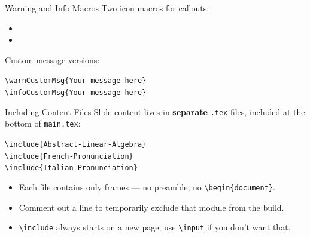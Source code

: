 \blueheader
\begin{frame}{Warning and Info Macros}
Two icon macros for callouts:
\medskip
\begin{itemize}
  \item \warn
  \item \info
\end{itemize}
\medskip
Custom message versions:
\begin{bluefocus}
\texttt{\textbackslash warnCustomMsg\{Your message here\}}\\
\texttt{\textbackslash infoCustomMsg\{Your message here\}}
\end{bluefocus}
\medskip
{}
\end{frame}

\blueheader
\begin{frame}{Including Content Files}
Slide content lives in \textbf{separate} \texttt{.tex} files, included at the bottom of \texttt{main.tex}:
\medskip
\begin{bluefocus}
\texttt{\textbackslash include\{Abstract-Linear-Algebra\}}\\
\texttt{\textbackslash include\{French-Pronunciation\}}\\
\texttt{\textbackslash include\{Italian-Pronunciation\}}
\end{bluefocus}
\medskip
\begin{itemize}
  \item Each file contains only frames --- no preamble, no \texttt{\textbackslash begin\{document\}}.
  \item Comment out a line to temporarily exclude that module from the build.
  \item \texttt{\textbackslash include} always starts on a new page; use \texttt{\textbackslash input} if you don't want that.
\end{itemize}
\end{frame}

